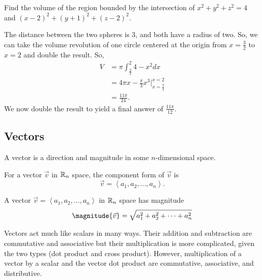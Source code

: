 \documentclass[11pt]{scrartcl}
\begin{document}
\begin{example}
    Find the volume of the region bounded by the intersection of $x^{2} + y^{2} + z^{2} = 4$ and $(x - 2)^{2} + (y + 1)^{2} + (z - 2)^{2}$.

    \begin{soln}
        The distance between the two spheres is 3, and both have a radius of two. So, we can take the volume revolution of one circle centered at the origin from $x = \frac{3}{2}$ to $x = 2$ and double the result. So,
        \begin{align*}
            V &= \pi\int_{\frac{3}{2}}^{2} 4 - x^{2}dx \\
            &= 4\pi x - \frac{\pi}{3}x^{3} \biggr\rvert_{x = \frac{3}{2}}^{x = 2} \\
            &= \frac{11\pi}{24}.
        \end{align*}
        We now double the result to yield a final answer of $\frac{11\pi}{12}$.
    \end{soln}
\end{example}

\subsection{Vectors}

\begin{definition}[Vector]
    A vector is a direction and magnitude in some $n$-dimensional space.
\end{definition}

\begin{definition}
    For a vector $\vec{v}$ in $\mathbb R_{n}$ space, the component form of $\vec{v}$ is
    \[\vec{v} = \left<a_{1}, a_{2}, \dots, a_{n}\right>.\]
\end{definition}

\begin{definition}
    A vector $\vec{v} = \left<a_{1}, a_{2}, \dots, a_{n}\right>$ in $\mathbb R_{n}$ space has magnitude
    \[\magnitude{\vec{v}} = \sqrt{a_{1}^{2} + a_{2}^{2} + \cdots + a_{n}^{2}}\]
\end{definition}

\begin{remark}
    Vectors act much like scalars in many ways. Their addition and subtraction are commutative and associative but their multiplication is more complicated, given the two types (dot product and cross product). However, multiplication of a vector by a scalar and the vector dot product are commutative, associative, and distributive.
\end{remark}
\end{document}

